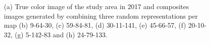 \documentclass[journal,article,submit,pdftex,moreauthors]{Definitions/mdpi}
\begin{document}
\begin{figure}[H]
\begin{subfigure}[t]{0.23\linewidth}
    \caption{}
	\label{fig:color_map_h}
	\end{subfigure}
	\caption{(a) True color image of the study area in 2017 and composites images generated by combining three random representations per map (b) 9-64-30, (c) 59-84-81, (d) 30-11-141, (e) 45-66-57, (f) 20-10-32, (g) 5-142-83 and (h) 24-79-133.}
	\label{color_maps}
\end{figure}

\end{document}
